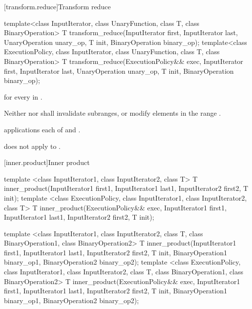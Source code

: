 [transform.reduce]{Transform reduce}

%
\begin{itemdecl}
template<class InputIterator, class UnaryFunction, class T, class BinaryOperation>
  T transform_reduce(InputIterator first, InputIterator last,
                     UnaryOperation unary_op, T init, BinaryOperation binary_op);
template<class ExecutionPolicy, class InputIterator,
         class UnaryFunction, class T, class BinaryOperation>
  T transform_reduce(ExecutionPolicy&& exec,
                     InputIterator first, InputIterator last,
                     UnaryOperation unary_op, T init, BinaryOperation binary_op);
\end{itemdecl}

\begin{itemdescr}
\pnum
\returns
{} for every  in .

\pnum
\requires
Neither  nor  shall invalidate subranges, or
modify elements in the range .

\pnum
\complexity
{} applications each of  and
.

\pnum
\realnotes
{} does not apply  to .
\end{itemdescr}

[inner.product]{Inner product}

%
\begin{itemdecl}
template <class InputIterator1, class InputIterator2, class T>
  T inner_product(InputIterator1 first1, InputIterator1 last1,
                  InputIterator2 first2, T init);
template <class ExecutionPolicy, class InputIterator1, class InputIterator2, class T>
  T inner_product(ExecutionPolicy&& exec,
                  InputIterator1 first1, InputIterator1 last1,
                  InputIterator2 first2, T init);

template <class InputIterator1, class InputIterator2, class T,
          class BinaryOperation1, class BinaryOperation2>
  T inner_product(InputIterator1 first1, InputIterator1 last1,
                  InputIterator2 first2, T init,
                  BinaryOperation1 binary_op1,
                  BinaryOperation2 binary_op2);
template <class ExecutionPolicy, class InputIterator1, class InputIterator2, class T,
          class BinaryOperation1, class BinaryOperation2>
  T inner_product(ExecutionPolicy&& exec,
                  InputIterator1 first1, InputIterator1 last1,
                  InputIterator2 first2, T init,
                  BinaryOperation1 binary_op1,
                  BinaryOperation2 binary_op2);
\end{itemdecl}

